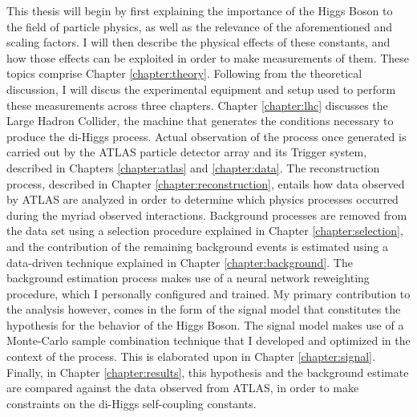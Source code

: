 This thesis will begin by first explaining the importance of the Higgs Boson to the field of particle physics,
    as well as the relevance of the aforementioned \kl and \kvv scaling factors.
I will then describe the physical effects of these constants,
    and how those effects can be exploited in order to make measurements of them.
These topics comprise Chapter \ref{chapter:theory}.
Following from the theoretical discussion,
    I will discus the experimental equipment and setup used to perform these measurements across three chapters.
Chapter \ref{chapter:lhc} discusses the Large Hadron Collider, the machine that generates the conditions necessary to produce the di-Higgs process.
Actual observation of the process once generated is carried out by the ATLAS particle detector array and its Trigger system,
    described in Chapters \ref{chapter:atlas} and \ref{chapter:data}.
The reconstruction process, described in Chapter \ref{chapter:reconstruction},
    entails how data observed by ATLAS are analyzed in order to determine which physics processes occurred during the myriad observed interactions.
Background processes are removed from the data set using a selection procedure explained in Chapter \ref{chapter:selection},
    and the contribution of the remaining background events is estimated using a data-driven technique explained in Chapter \ref{chapter:background}. 
The background estimation process makes use of a neural network reweighting procedure, which I personally configured and trained.
My primary contribution to the analysis however, comes in the form of the signal model that constitutes the hypothesis for the behavior of the Higgs Boson.
The signal model makes use of a Monte-Carlo sample combination technique that I developed and optimized in the context of the \vbfproc process.
This is elaborated upon in Chapter \ref{chapter:signal}.
Finally, in Chapter \ref{chapter:results}, this hypothesis and the background estimate are compared against the data observed from ATLAS,
    in order to make constraints on the di-Higgs self-coupling constants.


